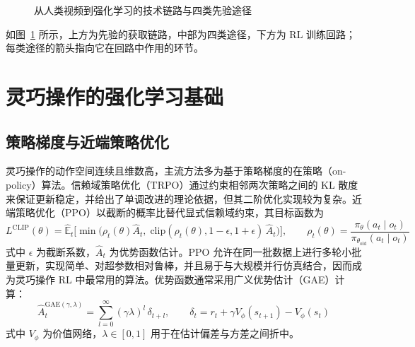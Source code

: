 \documentclass[UTF8,a4paper,zihao=-4]{ctexart}
\begin{document}
\begin{figure}[htbp]
  \caption{从人类视频到强化学习的技术链路与四类先验途径}\label{fig:framework}
\end{figure}

如图~\ref{fig:framework} 所示，上方为先验的获取链路，中部为四类途径，下方为 RL 训练回路；每类途径的箭头指向它在回路中作用的环节。

\section{灵巧操作的强化学习基础}\label{sec:rl}

\subsection{策略梯度与近端策略优化}

灵巧操作的动作空间连续且维数高，主流方法多为基于策略梯度的在策略（on-policy）算法。信赖域策略优化（TRPO）\cite{trpo}通过约束相邻两次策略之间的 KL 散度来保证更新稳定，并给出了单调改进的理论依据，但其二阶优化实现较为复杂。近端策略优化（PPO）\cite{ppo}以截断的概率比替代显式信赖域约束，其目标函数为
\begin{equation}\label{eq:ppo}
  L^{\mathrm{CLIP}}(\theta)=\hat{\mathbb{E}}_{t}\Big[\min\big(\rho_{t}(\theta)\hat{A}_{t},\;\mathrm{clip}(\rho_{t}(\theta),1-\epsilon,1+\epsilon)\,\hat{A}_{t}\big)\Big],\qquad
  \rho_{t}(\theta)=\frac{\pi_{\theta}(a_{t}\mid o_{t})}{\pi_{\theta_{\mathrm{old}}}(a_{t}\mid o_{t})}
\end{equation}
式中 $\epsilon$ 为截断系数，$\hat{A}_t$ 为优势函数估计。PPO 允许在同一批数据上进行多轮小批量更新，实现简单、对超参数相对鲁棒，并且易于与大规模并行仿真结合，因而成为灵巧操作 RL 中最常用的算法\cite{openai2018}。优势函数通常采用广义优势估计（GAE）\cite{gae}计算：
\begin{equation}\label{eq:gae}
  \hat{A}_{t}^{\mathrm{GAE}(\gamma,\lambda)}=\sum_{l=0}^{\infty}(\gamma\lambda)^{l}\,\delta_{t+l},\qquad
  \delta_{t}=r_{t}+\gamma V_{\phi}(s_{t+1})-V_{\phi}(s_{t})
\end{equation}
式中 $V_\phi$ 为价值网络，$\lambda\in[0,1]$ 用于在估计偏差与方差之间折中。
\end{document}
